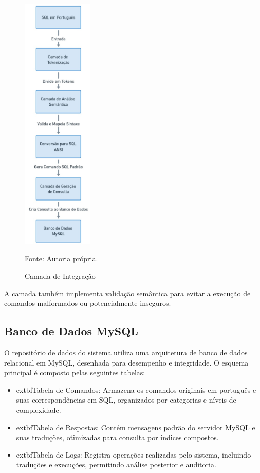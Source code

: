 \begin{figure}[H]
    \centering
    \includegraphics[width=0.3\textwidth]{figuras/FluxoConceitualTraducao.eps}
    \caption{Camada de Integração}
    Fonte: Autoria própria.
    \label{fig:Camada de traducao}
\end{figure}

A camada também implementa validação semântica para evitar a execução de comandos malformados ou potencialmente inseguros.

\subsection{Banco de Dados MySQL}
O repositório de dados do sistema utiliza uma arquitetura de banco de dados relacional em MySQL, desenhada para desempenho e integridade. O esquema principal é composto pelas seguintes tabelas:

\begin{itemize}
    \item 	extbf{Tabela de Comandos}: Armazena os comandos originais em português e suas correspondências em SQL, organizados por categorias e níveis de complexidade.
    \item 	extbf{Tabela de Respostas}: Contém mensagens padrão do servidor MySQL e suas traduções, otimizadas para consulta por índices compostos.
    \item 	extbf{Tabela de Logs}: Registra operações realizadas pelo sistema, incluindo traduções e execuções, permitindo análise posterior e auditoria.
\end{itemize}

